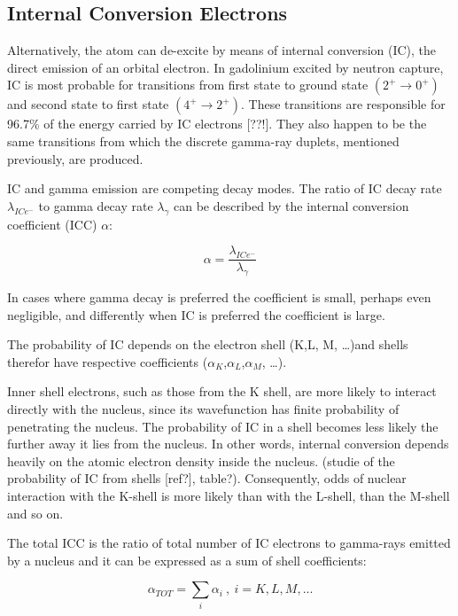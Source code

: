 \subsection{Internal Conversion Electrons}
Alternatively, the atom can de-excite by means of internal conversion (IC), the direct emission of an orbital electron. In gadolinium excited by neutron capture, IC is most probable for transitions from first state to ground state $(2^+ \rightarrow 0^+)$ and second state to first state $(4^+ \rightarrow 2^+)$. These transitions are responsible for 96.7\% of the energy carried by IC electrons [??!]. They also happen to be the same transitions from which the discrete gamma-ray duplets, mentioned previously, are produced.

IC and gamma emission are competing decay modes. The ratio of IC decay rate $\lambda_{ICe^-}$ to gamma decay rate $\lambda_{\gamma}$ can be described by the internal conversion coefficient (ICC) $\alpha$:

  \begin{equation}
      \alpha =  \frac{\lambda_{ICe^-}}{\lambda_{\gamma}}
  \end{equation}

In cases where gamma decay is preferred the coefficient is small, perhaps even negligible, and differently when IC is preferred the coefficient is large.

The probability of IC depends on the electron shell (K,L, M, …)and shells therefor have respective coefficients ($\alpha_K$,$\alpha_L$,$\alpha_M$, …).

Inner shell electrons, such as those from the K shell, are more likely to interact directly with the nucleus, since its wavefunction has finite probability of penetrating the nucleus. The probability of IC in a shell becomes less likely the further away it lies from the nucleus. In other words, internal conversion depends heavily on the atomic electron density inside the nucleus. (studie of the probability of IC from shells [ref?], table?). Consequently, odds of nuclear interaction with the K-shell is more likely than with the L-shell, than the M-shell and so on.

The total ICC is the ratio of total number of IC electrons to gamma-rays emitted by a nucleus and it can be expressed as a sum of shell coefficients:

\begin{equation}
    \alpha_{TOT} =  \sum_i \alpha_i \ , \ i = K, L, M, ...
\end{equation}

